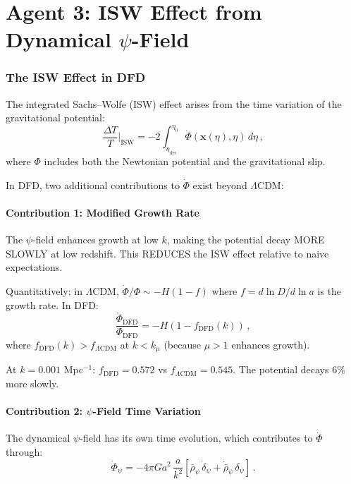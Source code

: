 \documentclass[11pt,a4paper]{article}
\begin{document}
\part{Agent 3: ISW Effect from Dynamical $\psi$-Field}
\label{part:isw}

\section{The ISW Effect in DFD}

The integrated Sachs--Wolfe (ISW) effect arises from the time variation of the gravitational potential:
\begin{equation}
\frac{\Delta T}{T}\bigg|_{\mathrm{ISW}} = -2\int_{\eta_{\mathrm{dec}}}^{\eta_0} \dot{\Phi}(\mathbf{x}(\eta), \eta)\,d\eta\,,
\end{equation}
where $\Phi$ includes both the Newtonian potential and the gravitational slip.

In DFD, two additional contributions to $\dot{\Phi}$ exist beyond $\Lambda$CDM:

\subsection{Contribution 1: Modified Growth Rate}

The $\psi$-field enhances growth at low $k$, making the potential decay MORE SLOWLY at low redshift. This REDUCES the ISW effect relative to naive expectations.

Quantitatively: in $\Lambda$CDM, $\dot{\Phi}/\Phi \sim -H(1 - f)$ where $f = d\ln D/d\ln a$ is the growth rate. In DFD:
\begin{equation}
\frac{\dot{\Phi}_{\mathrm{DFD}}}{\Phi_{\mathrm{DFD}}} = -H(1 - f_{\mathrm{DFD}}(k))\,,
\end{equation}
where $f_{\mathrm{DFD}}(k) > f_{\Lambda\mathrm{CDM}}$ at $k < k_\mu$ (because $\mu > 1$ enhances growth).

At $k = 0.001$ Mpc$^{-1}$: $f_{\mathrm{DFD}} = 0.572$ vs $f_{\Lambda\mathrm{CDM}} = 0.545$. The potential decays 6\% more slowly.

\subsection{Contribution 2: $\psi$-Field Time Variation}

The dynamical $\psi$-field has its own time evolution, which contributes to $\dot{\Phi}$ through:
\begin{equation}
\dot{\Phi}_\psi = -4\pi G a^2\,\frac{a}{k^2}\left[\bar{\rho}_\psi\,\dot{\delta}_\psi + \dot{\bar{\rho}}_\psi\,\delta_\psi\right]\,.
\end{equation}
\end{document}
